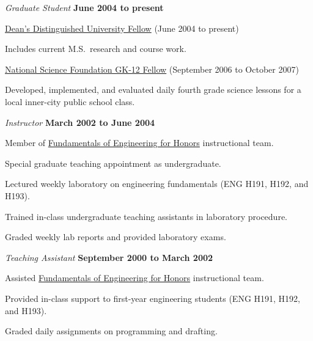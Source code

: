 \documentclass[10pt]{article}
\newenvironment{outerlist}[1][\enskip\textbullet]%
        {\begin{itemize}[#1]}{\end{itemize}%
         \vspace{-.6\baselineskip}}
\newenvironment{innerlist}[1][\enskip\textbullet]%
        {\begin{compactitem}[#1]}{\end{compactitem}}
\begin{document}
\begin{outerlist}
\item[] \textit{Graduate Student}%
        \hfill \textbf{June 2004 to present}
\begin{innerlist}
\item \href{http://www.gradsch.osu.edu/Content.aspx?Content=44&itemid=2}
           {Dean's Distinguished University Fellow}
      (June 2004 to present)
        \begin{innerlist}
        \item[] Includes current M.S.~research and course work.
        \end{innerlist}
\item \href{http://www.nsfgk12.org/}
           {National Science Foundation GK-12 Fellow}
      (September 2006 to October 2007)
        \begin{innerlist}
        \item[] Developed, implemented, and evaluated daily fourth grade
                science lessons for a local inner-city public school
                class.
        \end{innerlist}
\end{innerlist}

\item[] \textit{Instructor}%
        \hfill \textbf{March 2002 to June 2004}
\begin{innerlist}
\item Member of \href{http://feh.eng.ohio-state.edu/}
                     {Fundamentals of Engineering for Honors} 
      instructional team.
\item Special graduate teaching appointment as undergraduate.
\item Lectured weekly laboratory on engineering fundamentals (ENG H191,
        H192, and H193).
\item Trained in-class undergraduate teaching assistants in laboratory
        procedure.
\item Graded weekly lab reports and provided laboratory exams.
\end{innerlist}

\item[] \textit{Teaching Assistant}%
        \hfill \textbf{September 2000 to March 2002}
\begin{innerlist}
\item Assisted \href{http://feh.eng.ohio-state.edu/}
                    {Fundamentals of Engineering for Honors}
      instructional team.
\item Provided in-class support to first-year engineering students (ENG
        H191, H192, and H193).
\item Graded daily assignments on programming and drafting.
\end{innerlist}


\end{outerlist}
\end{document}
